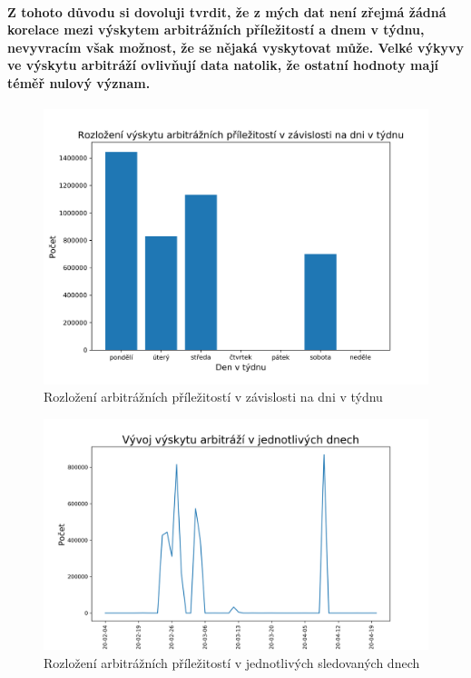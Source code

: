 \documentclass[thesis=B,czech]{FITthesis}[2019/03/21]
\begin{document}
\paragraph{
 Z tohoto důvodu si dovoluji tvrdit, že z mých dat není zřejmá žádná korelace mezi výskytem arbitrážních příležitostí a dnem v týdnu, nevyvracím však možnost, že se nějaká vyskytovat může. Velké výkyvy ve výskytu arbitráží ovlivňují data natolik, že ostatní hodnoty mají téměř nulový význam.
}
\begin{figure}\centering
	\includegraphics[width=1\textwidth]{images/weekday_distribution.png}
	\caption{Rozložení arbitrážních příležitostí v závislosti na dni v týdnu }\label{weekday_distribution}
\end{figure}
\begin{figure}\centering
	\includegraphics[width=1\textwidth]{images/occurences.png}
	\caption{Rozložení arbitrážních příležitostí v jednotlivých sledovaných dnech}\label{occurences}
\end{figure}
\end{document}
